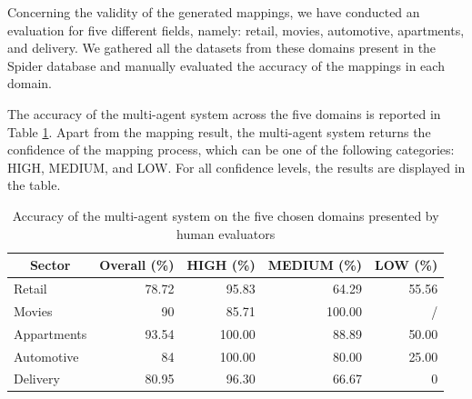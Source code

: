 \documentclass[runningheads]{llncs}
\begin{document}
Concerning the validity of the generated mappings, we have conducted an evaluation for five different fields, namely: retail, movies, automotive, apartments, and delivery. We gathered all the datasets from these domains present in the Spider database and manually evaluated the accuracy of the mappings in each domain. 

The accuracy of the multi-agent system across the five domains is reported in Table \ref{tab:res_acc}. Apart from the mapping result, the multi-agent system returns the confidence of the mapping process, which can be one of the following categories: HIGH, MEDIUM, and LOW. For all confidence levels, the results are displayed in the table. 

\begin{table}[!h]
\caption{Accuracy of the multi-agent system on the five chosen domains presented by human evaluators}\label{tab:res_acc}
\begin{tabular}{|l|r|r|r|r|}
\hline
\multicolumn{1}{|c|}{\textbf{Sector}} & \multicolumn{1}{c|}{\textbf{Overall (\%)}} & \multicolumn{1}{l|}{\textbf{HIGH (\%)}} & \multicolumn{1}{l|}{\textbf{MEDIUM (\%)}} & \multicolumn{1}{l|}{\textbf{LOW (\%)}} \\ \hline
Retail                                & 78.72                                               & 95.83                                              & 64.29                                                & 55.56                                             \\ \hline
Movies                                & 90                                                  & 85.71                                              & 100.00                                               & /                                                 \\ \hline
Appartments                           & 93.54                                               & 100.00                                             & 88.89                                                & 50.00                                             \\ \hline
Automotive                            & 84                                                  & 100.00                                             & 80.00                                                & 25.00                                             \\ \hline
Delivery                              & 80.95                                               & 96.30                                              & 66.67                                                & 0                                                 \\ \hline
\end{tabular}
\end{table}
\end{document}
